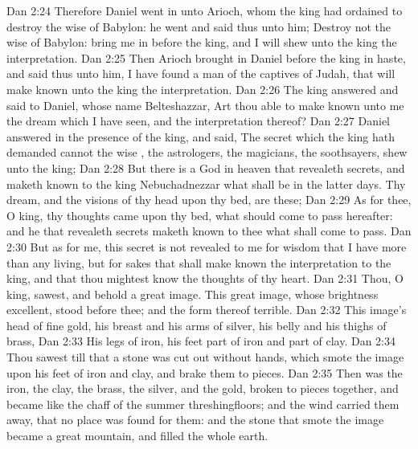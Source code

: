 \vs Dan 2:24 Therefore Daniel went in unto Arioch, whom the king had ordained to destroy the wise  of Babylon: he went and said thus unto him; Destroy not the wise  of Babylon: bring me in before the king, and I will shew unto the king the interpretation.
\vs Dan 2:25 Then Arioch brought in Daniel before the king in haste, and said thus unto him, I have found a man of the captives of Judah, that will make known unto the king the interpretation.
\vs Dan 2:26 The king answered and said to Daniel, whose name  Belteshazzar, Art thou able to make known unto me the dream which I have seen, and the interpretation thereof?
\vs Dan 2:27 Daniel answered in the presence of the king, and said, The secret which the king hath demanded cannot the wise , the astrologers, the magicians, the soothsayers, shew unto the king;
\vs Dan 2:28 But there is a God in heaven that revealeth secrets, and maketh known to the king Nebuchadnezzar what shall be in the latter days. Thy dream, and the visions of thy head upon thy bed, are these;
\vs Dan 2:29 As for thee, O king, thy thoughts came  upon thy bed, what should come to pass hereafter: and he that revealeth secrets maketh known to thee what shall come to pass.
\vs Dan 2:30 But as for me, this secret is not revealed to me for  wisdom that I have more than any living, but for  sakes that shall make known the interpretation to the king, and that thou mightest know the thoughts of thy heart.
\vs Dan 2:31 Thou, O king, sawest, and behold a great image. This great image, whose brightness  excellent, stood before thee; and the form thereof  terrible.
\vs Dan 2:32 This image's head  of fine gold, his breast and his arms of silver, his belly and his thighs of brass,
\vs Dan 2:33 His legs of iron, his feet part of iron and part of clay.
\vs Dan 2:34 Thou sawest till that a stone was cut out without hands, which smote the image upon his feet  of iron and clay, and brake them to pieces.
\vs Dan 2:35 Then was the iron, the clay, the brass, the silver, and the gold, broken to pieces together, and became like the chaff of the summer threshingfloors; and the wind carried them away, that no place was found for them: and the stone that smote the image became a great mountain, and filled the whole earth.

